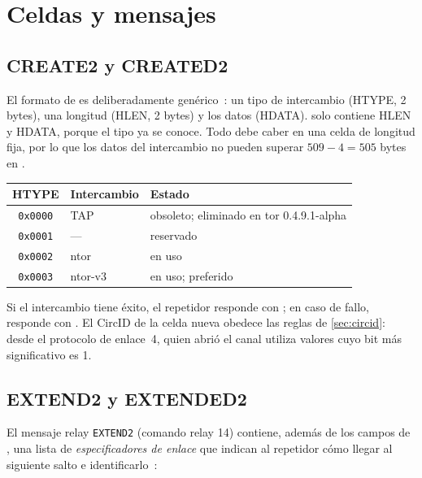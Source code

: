 \section{Celdas y mensajes}\label{sec:circ-celle}

\subsection{CREATE2 y CREATED2}

El formato de  es deliberadamente genérico~: un tipo de intercambio (HTYPE, 2 bytes), una longitud (HLEN, 2 bytes) y los datos (HDATA).  solo contiene HLEN y HDATA, porque el tipo ya se conoce. Todo debe caber en una celda de longitud fija, por lo que los datos del intercambio no pueden superar $509 - 4 = 505$ bytes en .

\begin{center}
\begin{tabular}{cll}
\toprule
HTYPE & Intercambio & Estado \\
\midrule
\texttt{0x0000} & TAP & obsoleto; eliminado en tor 0.4.9.1-alpha \\
\texttt{0x0001} & --- & reservado \\
\texttt{0x0002} & ntor & en uso \\
\texttt{0x0003} & ntor-v3 & en uso; preferido \\
\bottomrule
\end{tabular}
\end{center}

Si el intercambio tiene éxito, el repetidor responde con ; en caso de fallo, responde con . El CircID de la celda nueva obedece las reglas de \cref{sec:circid}: desde el protocolo de enlace~4, quien abrió el canal utiliza valores cuyo bit más significativo es 1.

\subsection{EXTEND2 y EXTENDED2}\label{sec:extend2}

El mensaje relay \texttt{EXTEND2} (comando relay 14) contiene, además de los campos de , una lista de \emph{especificadores de enlace} que indican al repetidor cómo llegar al siguiente salto e identificarlo~:

